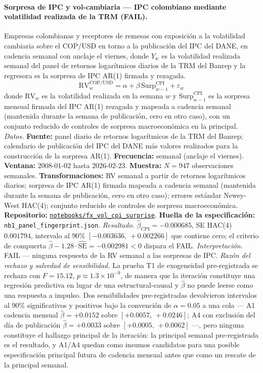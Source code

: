 \documentclass[11pt,a4paper]{article}
\theoremstyle{plain}
\begin{document}
\paragraph{Sorpresa de IPC y vol-cambiaria --- IPC colombiano mediante volatilidad realizada de la TRM (FAIL).}
Empresas colombianas y receptores de remesas con exposición a la volatilidad cambiaria sobre el COP/USD en torno a la publicación del IPC del DANE, en cadencia semanal con anclaje el viernes, donde \(Y_w\) es la volatilidad realizada semanal del panel de retornos logarítmicos diarios de la TRM del Banrep y la regresora es la sorpresa de IPC AR(1) firmada y rezagada.
\[ \mathrm{RV}^{\mathrm{COP/USD}}_w = \alpha + \beta\, \mathrm{Surp}^{\mathrm{CPI}}_{w-1} + \varepsilon_w \]
donde \(\mathrm{RV}_w\) es la volatilidad realizada en la semana \(w\) y \(\mathrm{Surp}^{\mathrm{CPI}}_{w-1}\) es la sorpresa mensual firmada del IPC AR(1) rezagada y mapeada a cadencia semanal (mantenida durante la semana de publicación, cero en otro caso), con un conjunto reducido de controles de sorpresa macroeconómica en la principal.
\textit{Datos.} \textbf{Fuente:} panel diario de retornos logarítmicos de la TRM del Banrep; calendario de publicación del IPC del DANE más valores realizados para la construcción de la sorpresa AR(1). \textbf{Frecuencia:} semanal (anclaje el viernes). \textbf{Ventana:} 2008-01-02 hasta 2026-02-23. \textbf{Muestra:} \(N = 947\) observaciones semanales. \textbf{Transformaciones:} RV semanal a partir de retornos logarítmicos diarios; sorpresa de IPC AR(1) firmada mapeada a cadencia semanal (mantenida durante la semana de publicación, cero en otro caso); errores estándar Newey-West HAC(4); conjunto reducido de controles de sorpresa macroeconómica. \textbf{Repositorio:} \href{https://github.com/JMSBPP/abrigo-analytics/tree/master/notebooks/fx_vol_cpi_surprise}{\texttt{notebooks/fx\_vol\_cpi\_surprise}}. \textbf{Huella de la especificación:} \texttt{nb1\_panel\_fingerprint.json}.
\textit{Resultado.} \(\hat{\beta}_{\mathrm{CPI}} = -0.000685\), SE HAC(4) \(0.001794\), intervalo al \(90\%\) \([-0.003636,\, +0.002266]\) que contiene cero; el criterio de compuerta \(\hat{\beta} - 1.28 \cdot \widehat{\mathrm{SE}} = -0.002981 < 0\) dispara el FAIL.
\textit{Interpretación.} FAIL --- ninguna respuesta de la RV semanal a las sorpresas de IPC.
\textit{Razón del rechazo y salvedad de sensibilidad.} La prueba T1 de exogeneidad pre-registrada se rechaza con \(F = 15.12\), \(p \approx 1.3 \times 10^{-9}\), de manera que la iteración constituye una regresión predictiva en lugar de una estructural-causal y \(\hat{\beta}\) no puede leerse como una respuesta a impulso. Dos sensibilidades pre-registradas devolvieron intervalos al \(90\%\) significativos y positivos bajo la convención de \(\alpha = 0.05\) a una cola --- A1 cadencia mensual \(\hat{\beta} = +0.0152\) sobre \([+0.0057,\, +0.0246]\); A4 con exclusión del día de publicación \(\hat{\beta} = +0.0033\) sobre \([+0.0005,\, +0.0062]\) ---, pero ninguna constituye el hallazgo principal de la iteración: la principal semanal pre-registrada es el resultado, y A1/A4 quedan como insumos candidatos para una posible especificación principal futura de cadencia mensual antes que como un rescate de la principal semanal.
\end{document}
